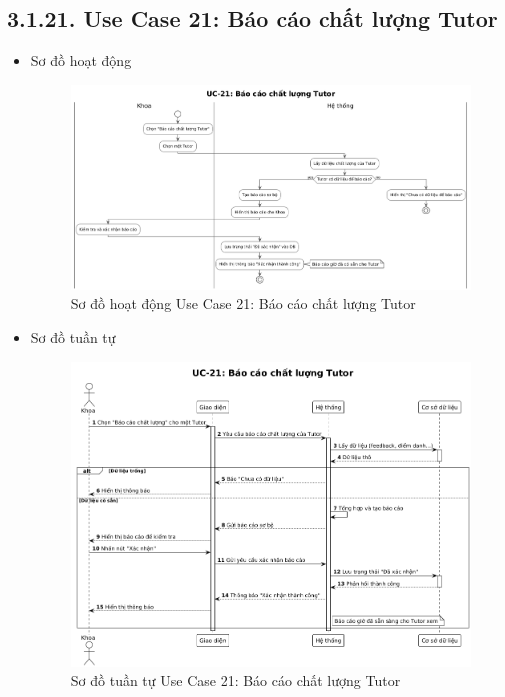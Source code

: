\subsection*{3.1.21. Use Case 21: Báo cáo chất lượng Tutor}
\begin{itemize}
    \item Sơ đồ hoạt động
    \begin{figure}[H]
    \centering
    \includegraphics[scale=0.35 ]{Picture/ACUC21.png}
    \caption{Sơ đồ hoạt động Use Case 21: Báo cáo chất lượng Tutor}
    \end{figure}
    \item Sơ đồ tuần tự
    \begin{figure}[H]
    \centering
    \includegraphics[scale=0.4 ]{Picture/SEUC21.png}
    \caption{Sơ đồ tuần tự Use Case 21: Báo cáo chất lượng Tutor}
    \end{figure}
\end{itemize}
